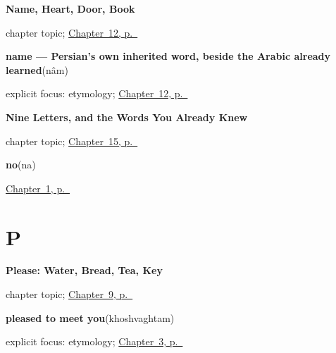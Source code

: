 \noindent\begin{minipage}[t]{\linewidth}
\raggedright
\textbf{Name, Heart, Door, Book}\par
\footnotesize chapter topic; \hyperref[ch:fa-name-heart-door-book]{Chapter~12, p.~\pageref*{ch:fa-name-heart-door-book}}
\end{minipage}\par\smallskip

\noindent\begin{minipage}[t]{\linewidth}
\raggedright
\textbf{name — Persian's own inherited word, beside the Arabic  already learned}\enspace\emph{}\enspace(nâm)\par
\footnotesize explicit focus: etymology; \hyperref[ch:fa-name-heart-door-book]{Chapter~12, p.~\pageref*{ch:fa-name-heart-door-book}}
\end{minipage}\par\smallskip

\noindent\begin{minipage}[t]{\linewidth}
\raggedright
\textbf{Nine Letters, and the Words You Already Knew}\par
\footnotesize chapter topic; \hyperref[ch:fa-script-nine]{Chapter~15, p.~\pageref*{ch:fa-script-nine}}
\end{minipage}\par\smallskip

\noindent\begin{minipage}[t]{\linewidth}
\raggedright
\textbf{no}\enspace\emph{}\enspace(na)\par
\footnotesize \hyperref[ch:persian-greetings]{Chapter~1, p.~\pageref*{ch:persian-greetings}}
\end{minipage}\par\smallskip

\section*{P}

\noindent\begin{minipage}[t]{\linewidth}
\raggedright
\textbf{Please: Water, Bread, Tea, Key}\par
\footnotesize chapter topic; \hyperref[ch:fa-please-requests]{Chapter~9, p.~\pageref*{ch:fa-please-requests}}
\end{minipage}\par\smallskip

\noindent\begin{minipage}[t]{\linewidth}
\raggedright
\textbf{pleased to meet you}\enspace\emph{}\enspace(khoshvaghtam)\par
\footnotesize explicit focus: etymology; \hyperref[ch:fa-ask-and-answer-names]{Chapter~3, p.~\pageref*{ch:fa-ask-and-answer-names}}
\end{minipage}\par\smallskip

